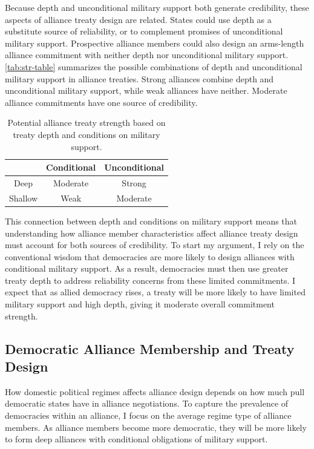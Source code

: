 \documentclass[12pt]{article}
\begin{document}
Because depth and unconditional military support both generate credibility, these aspects of alliance treaty design are related. 
States could use depth as a substitute source of reliability, or to complement promises of unconditional military support. 
Prospective alliance members could also design an arms-length alliance commitment with neither depth nor unconditional military support. 
\autoref{tab:str-table} summarizes the possible combinations of depth and unconditional military support in alliance treaties. 
Strong alliances combine depth and unconditional military support, while weak alliances have neither. 
Moderate alliance commitments have one source of credibility. 


\begin{table}[hbt!]
\begin{center}
\caption{Potential alliance treaty strength based on treaty depth and conditions on military support.}
\begin{tabular}{ccc} 
                 & Conditional & Unconditional \\
\toprule
          Deep   &  Moderate & Strong \\
         Shallow & Weak      & Moderate \\
 \bottomrule
\end{tabular}
\label{tab:str-table}
\end{center} 
\end{table}



This connection between depth and conditions on military support means that understanding how alliance member characteristics affect alliance treaty design must account for both sources of credibility.  
To start my argument, I rely on the conventional wisdom that democracies are more likely to design alliances with conditional military support. 
As a result, democracies must then use greater treaty depth to address reliability concerns from these limited commitments.
I expect that as allied democracy rises, a treaty will be more likely to have limited military support and high depth, giving it moderate overall commitment strength. 


\subsection{Democratic Alliance Membership and Treaty Design}


How domestic political regimes affects alliance design depends on how much pull democratic states have in alliance negotiations. 
To capture the prevalence of democracies within an alliance, I focus on the average regime type of alliance members. 
As alliance members become more democratic, they will be more likely to form deep alliances with conditional obligations of military support. 
\end{document}
